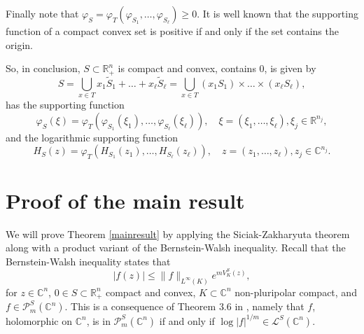 \documentclass[a4paper,12pt,leqno,english]{article}
\numberwithin{equation}{section}
\begin{document}
Finally note that $\varphi_S = \varphi_T(\varphi_{S_1}, \dots, \varphi_{S_\ell}) \geq 0$.
It is well known that the supporting function of a compact convex set is positive if and only if the set contains the origin.

So, in conclusion, $S \subset \mathbb{R}_+^n$ is compact and convex, contains $0$, is given by
\begin{equation}
\label{eq:2.7}
    S
    =
    \bigcup_{x \in T} x_1 \widetilde{S}_1 + \dots + x_\ell \widetilde{S}_\ell
    =
    \bigcup_{x \in T} (x_1 S_1) \times \dots \times (x_\ell S_\ell),
\end{equation}
has the supporting function
\begin{equation}
\label{bg:eq.15}
    \varphi_S(\xi)
    =
    \varphi_T(\varphi_{S_1}(\xi_1), \dots, \varphi_{S_\ell}(\xi_\ell)),
    \quad
    \xi = (\xi_1, \dots, \xi_\ell), \xi_j \in \mathbb{R}^{n_j},
\end{equation}
and the logarithmic supporting function
\begin{equation*}
    H_S(z)
    =
    \varphi_T(H_{S_1}(z_1), \dots, H_{S_\ell}(z_\ell)),
    \quad
    z = (z_1, \dots, z_\ell), z_j \in \mathbb{C}^{n_j}.
\end{equation*}






























\section{Proof of the main result}
We will prove Theorem \ref{mainresult} by applying the Siciak-Zakharyuta theorem along with a product variant of the Bernstein-Walsh inequality.
Recall that the Bernstein-Walsh inequality states that
\begin{equation*}
    |f(z)|
    \leq
    \|f\|_{L^\infty(K)} e^{mV^S_K(z)},
\end{equation*}
for
    $z \in \mathbb{C}^n$,
    $0 \in S \subset \mathbb{R}^n_+$ compact and convex,
    $K \subset \mathbb{C}^n$ non-pluripolar compact, and
    $f \in \mathcal{P}^S_m(\mathbb{C}^n)$.
This is a consequence of Theorem $3.6$ in \cite{MagSigSigSno:2023},
    namely that $f$, holomorphic on $\mathbb{C}^n$, is in $\mathcal{P}^S_m(\mathbb{C}^n)$
        if and only if $\log |f|^{1/m} \in \mathcal{L}^S(\mathbb{C}^n)$.
\end{document}
